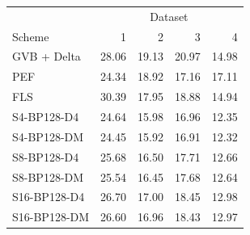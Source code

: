 \begin{tabular}{lrrrr}
\toprule
 & \multicolumn{4}{c}{Dataset} \\
Scheme & 1 & 2 & 3 & 4 \\
\midrule
GVB + Delta & 28.06 & 19.13 & 20.97 & 14.98 \\
PEF & 24.34 & 18.92 & 17.16 & 17.11 \\
FLS & 30.39 & 17.95 & 18.88 & 14.94 \\
S4-BP128-D4 & 24.64 & 15.98 & 16.96 & 12.35 \\
S4-BP128-DM & 24.45 & 15.92 & 16.91 & 12.32 \\
S8-BP128-D4 & 25.68 & 16.50 & 17.71 & 12.66 \\
S8-BP128-DM & 25.54 & 16.45 & 17.68 & 12.64 \\
S16-BP128-D4 & 26.70 & 17.00 & 18.45 & 12.98 \\
S16-BP128-DM & 26.60 & 16.96 & 18.43 & 12.97 \\
\bottomrule
\end{tabular}
